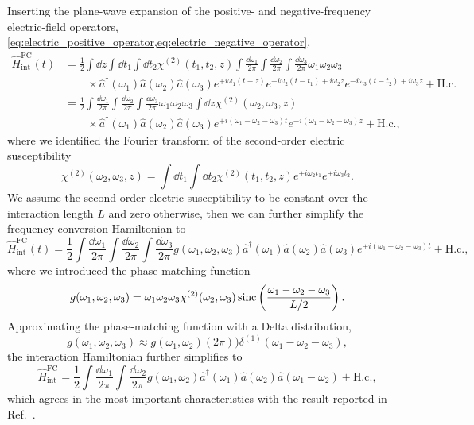 Inserting the plane-wave expansion of the positive- and negative-frequency electric-field operators, \cref{eq:electric_positive_operator,eq:electric_negative_operator},
\begin{equation}
	\begin{split}
		\hat{H}_\text{int}^\text{FC}(t)
		&=
		\frac{1}{2}
		\int\dd{z}
		\int\dd{t_1}
		\int\dd{t_2}
		\chi^{(2)}(t_1,t_2,z)
		\int\frac{\dd{\omega_1}}{2\pi}
		\int\frac{\dd{\omega_2}}{2\pi}
		\int\frac{\dd{\omega_3}}{2\pi}
		\omega_1
		\omega_2
		\omega_3
		\\
		&\qquad\times
		\hat{a}^\dagger(\omega_1)
		\hat{a}(\omega_2)
		\hat{a}(\omega_3)
		e^{+i\omega_1(t-z)}
		e^{-i\omega_2(t-t_1)+i\omega_2z}
		e^{-i\omega_3(t-t_2)+i\omega_3z}
		+
		\text{H.c.}
		\\
		&=
		\frac{1}{2}
		\int\frac{\dd{\omega_1}}{2\pi}
		\int\frac{\dd{\omega_2}}{2\pi}
		\int\frac{\dd{\omega_3}}{2\pi}
		\omega_1
		\omega_2
		\omega_3
		\int\dd{z}
		\chi^{(2)}(\omega_2,\omega_3,z)
		\\
		&\qquad\times
		\hat{a}^\dagger(\omega_1)
		\hat{a}(\omega_2)
		\hat{a}(\omega_3)
		e^{+i(\omega_1-\omega_2-\omega_3)t}
		e^{-i(\omega_1-\omega_2-\omega_3)z}
		+
		\text{H.c.}
		,
	\end{split}
\end{equation}
where we identified the Fourier transform of the second-order electric susceptibility
\begin{equation}
	\chi^{(2)}(\omega_2,\omega_3,z)
	=
	\int\dd{t_1}
	\int\dd{t_2}
	\chi^{(2)}(t_1,t_2,z)
	e^{+i\omega_2 t_1}
	e^{+i\omega_3 t_2}
	.
\end{equation}
We assume the second-order electric susceptibility to be constant over the interaction length $L$ and zero otherwise, then we can further simplify the frequency-conversion Hamiltonian to
\begin{equation}
	\hat{H}_\text{int}^\text{FC}(t)
	=
	\frac{1}{2}
	\int\frac{\dd{\omega_1}}{2\pi}
	\int\frac{\dd{\omega_2}}{2\pi}
	\int\frac{\dd{\omega_3}}{2\pi}
	g(\omega_1,\omega_2,\omega_3)
	\hat{a}^\dagger(\omega_1)
	\hat{a}(\omega_2)
	\hat{a}(\omega_3)
	e^{+i(\omega_1-\omega_2-\omega_3)t}
	+
	\text{H.c.}
	,
\end{equation}
where we introduced the phase-matching function
\begin{equation}
	g(\omega_1,\omega_2,\omega_3)
	=
	\omega_1
	\omega_2
	\omega_3
	\chi^{(2)}(\omega_2,\omega_3)
	\operatorname{sinc}\left(\frac{\omega_1-\omega_2-\omega_3}{L/2}\right)
	.
\end{equation}
Approximating the phase-matching function with a Delta distribution,
\begin{equation}
	g(\omega_1,\omega_2,\omega_3)
	\approx
	g(\omega_1,\omega_2)
	(2\pi))
	\delta^{(1)}(\omega_1-\omega_2-\omega_3)
	,
\end{equation}
the interaction Hamiltonian further simplifies to
\begin{equation}
	\hat{H}_\text{int}^\text{FC}
	=
	\frac{1}{2}
	\int\frac{\dd{\omega_1}}{2\pi}
	\int\frac{\dd{\omega_2}}{2\pi}
	g(\omega_1,\omega_2)
	\hat{a}^\dagger(\omega_1)
	\hat{a}(\omega_2)
	\hat{a}(\omega_1-\omega_2)
	+
	\text{H.c.}
	,
\end{equation}
which agrees in the most important characteristics with the result reported in Ref.~\cite[eq.~35]{Horoshko2018}.